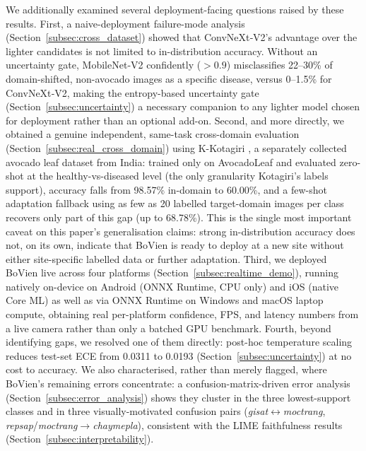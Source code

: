 We additionally examined several deployment-facing questions raised by these results. First, a naive-deployment failure-mode analysis (Section~\ref{subsec:cross_dataset}) showed that ConvNeXt‑V2's advantage over the lighter candidates is not limited to in-distribution accuracy. Without an uncertainty gate, MobileNet‑V2 confidently (${>}0.9$) misclassifies 22--30\% of domain-shifted, non-avocado images as a specific disease, versus 0--1.5\% for ConvNeXt‑V2, making the entropy-based uncertainty gate (Section~\ref{subsec:uncertainty}) a necessary companion to any lighter model chosen for deployment rather than an optional add-on. Second, and more directly, we obtained a genuine independent, same-task cross-domain evaluation (Section~\ref{subsec:real_cross_domain}) using K-Kotagiri \citeyearpar{kotagiri2024avocado}, a separately collected avocado leaf dataset from India: trained only on AvocadoLeaf and evaluated zero-shot at the healthy-vs-diseased level (the only granularity Kotagiri's labels support), accuracy falls from 98.57\% in-domain to 60.00\%, and a few-shot adaptation fallback using as few as 20 labelled target-domain images per class recovers only part of this gap (up to 68.78\%). This is the single most important caveat on this paper's generalisation claims: strong in-distribution accuracy does not, on its own, indicate that BoVien is ready to deploy at a new site without either site-specific labelled data or further adaptation. Third, we deployed BoVien live across four platforms (Section~\ref{subsec:realtime_demo}), running natively on-device on Android (ONNX Runtime, CPU only) and iOS (native Core ML) as well as via ONNX Runtime on Windows and macOS laptop compute, obtaining real per-platform confidence, FPS, and latency numbers from a live camera rather than only a batched GPU benchmark. Fourth, beyond identifying gaps, we resolved one of them directly: post-hoc temperature scaling reduces test-set ECE from 0.0311 to 0.0193 (Section~\ref{subsec:uncertainty}) at no cost to accuracy. We also characterised, rather than merely flagged, where BoVien's remaining errors concentrate: a confusion-matrix-driven error analysis (Section~\ref{subsec:error_analysis}) shows they cluster in the three lowest-support classes and in three visually-motivated confusion pairs (\textit{gisat}$\leftrightarrow$\textit{moctrang}, \textit{repsap}/\textit{moctrang}$\to$\textit{chaymepla}), consistent with the LIME faithfulness results (Section~\ref{subsec:interpretability}).

